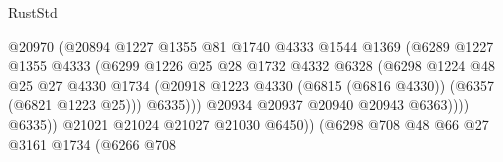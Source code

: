 \begin{lexlean}{RustStd}
\begin{coremodule}
                                          @20970
                                          (@20894
                                            @1227
                                            @1355
                                            @81
                                            @1740
                                            @4333
                                            @1544
                                            @1369
                                            (@6289
                                              @1227
                                              @1355
                                              @4333
                                              (@6299
                                                @1226
                                                @25
                                                @28
                                                @1732
                                                @4332
                                                @6328
                                                (@6298
                                                  @1224
                                                  @48
                                                  @25
                                                  @27
                                                  @4330
                                                  @1734
                                                  (@20918
                                                    @1223
                                                    @4330
                                                    (@6815 (@6816 @4330))
                                                    (@6357 (@6821 @1223 @25)))
                                                  @6335)))
                                            @20934
                                            @20937
                                            @20940
                                            @20943
                                            @6363))))
                                    @6335))
                                @21021
                                @21024
                                @21027
                                @21030
                                @6450))
                            (@6298
                              @708
                              @48
                              @66
                              @27
                              @3161
                              @1734
                              (@6266
                                @708

\end{coremodule}
\end{lexlean}
